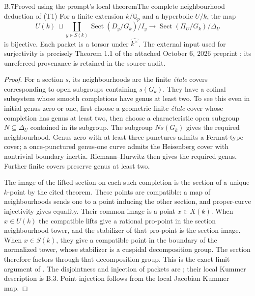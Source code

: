 \begin{statement}{B.7}{Proved using the prompt's local theorem}{The complete neighbourhood deduction of (T1)}
For a finite extension $k/\mathbb Q_p$ and a hyperbolic $U/k$, the map
\[
 U(k)\ \sqcup\!\coprod_{y\in S(k)}\operatorname{Sect}(D_y/G_k)/I_y
 \longrightarrow \operatorname{Sect}(\Pi_U/G_k)/\Delta_U
\]
is bijective.  Each packet is a torsor under $\widehat{k^\times}$.
The external input used for surjectivity is precisely Theorem 1.1 of
the attached October 6, 2026 preprint \cite{B_OpenAIPadic}; its
unrefereed provenance is retained in the source audit.
\end{statement}
\begin{proof}
For a section $s$, its neighbourhoods are the finite \emph{\'etale}
covers corresponding to open subgroups containing $s(G_k)$.
They have a cofinal subsystem whose smooth completions have genus at
least two.  To see this even in initial genus zero or one, first choose
a geometric finite \emph{\'etale} cover whose completion has genus at
least two, then choose a characteristic open subgroup $N\subseteq
\Delta_U$ contained in its subgroup.  The subgroup $N s(G_k)$ gives
the required neighbourhood.  Genus zero with at least three punctures
admits a Fermat-type cover; a once-punctured genus-one curve admits
the Heisenberg cover with nontrivial boundary inertia.  Riemann--Hurwitz
then gives the required genus.  Further finite covers preserve genus
at least two.

The image of the lifted section on each such completion is the section
of a unique $k$-point by the cited theorem.  These points are compatible:
a map of neighbourhoods sends one to a point inducing the other
section, and proper-curve injectivity gives equality.  Their common
image is a point $x\in X(k)$.  When $x\in U(k)$ the compatible lifts
give a rational pro-point in the section neighbourhood tower, and
the stabilizer of that pro-point is the section image.  When
$x\in S(k)$, they give a compatible point in the boundary of the
normalized tower, whose stabilizer is a cuspidal decomposition group.
The section therefore factors through that decomposition group.
This is the exact limit argument of
\cite[\S2.1.2]{B_StixLocal}.  The disjointness and injection of packets
are \cite[Theorem 14]{B_StixCuspidal}; their local Kummer description
is B.3.  Point injection follows from the local Jacobian Kummer map.
\end{proof}


